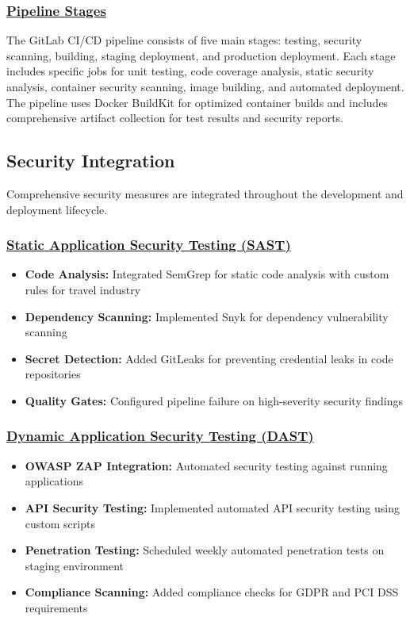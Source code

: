 \subsubsection*{\underline{Pipeline Stages}}
The GitLab CI/CD pipeline consists of five main stages: testing, security scanning, building, staging deployment, and production deployment. Each stage includes specific jobs for unit testing, code coverage analysis, static security analysis, container security scanning, image building, and automated deployment. The pipeline uses Docker BuildKit for optimized container builds and includes comprehensive artifact collection for test results and security reports.

\subsection{Security Integration}
Comprehensive security measures are integrated throughout the development and deployment lifecycle.

\subsubsection*{\underline{Static Application Security Testing (SAST)}}
\begin{itemize}
    \item \textbf{Code Analysis:} Integrated SemGrep for static code analysis with custom rules for travel industry
    \item \textbf{Dependency Scanning:} Implemented Snyk for dependency vulnerability scanning
    \item \textbf{Secret Detection:} Added GitLeaks for preventing credential leaks in code repositories
    \item \textbf{Quality Gates:} Configured pipeline failure on high-severity security findings
\end{itemize}

\subsubsection*{\underline{Dynamic Application Security Testing (DAST)}}
\begin{itemize}
    \item \textbf{OWASP ZAP Integration:} Automated security testing against running applications
    \item \textbf{API Security Testing:} Implemented automated API security testing using custom scripts
    \item \textbf{Penetration Testing:} Scheduled weekly automated penetration tests on staging environment
    \item \textbf{Compliance Scanning:} Added compliance checks for GDPR and PCI DSS requirements
\end{itemize}

